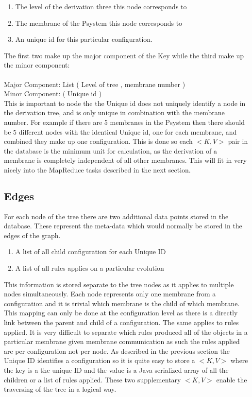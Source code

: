\documentclass[runningheads]{llncs}
\begin{document}
\begin{enumerate}
  \item The level of the derivation three this node corresponds to 
  \item The membrane of the Psystem this node corresponds to 
  \item An unique id for this particular configuration.
\end{enumerate}

The first two make up the major component of the Key while the third make up the minor component: \\ \\
Major Component: List ( Level of tree ,  membrane number ) \\
Minor Component: ( Unique id ) \\

This is important to node the the Unique id does not uniquely identify a node in the derivation tree, and is only unique in combination with the membrane number. For example if there are 5 membranes in the Psystem then there should be 5 different nodes with the identical Unique id, one for each membrane, and combined they make up one configuration. This is done so each $<K,V>$ pair in the database is the minimum unit for calculation, as the derivation of a membrane is completely independent of all other membranes. This will fit in very nicely into the MapReduce tasks described in the next section.

\subsection*{Edges}

For each node of the tree there are two additional data points stored in the database. These represent the meta-data which would normally be stored in the edges of the graph. 

\begin{enumerate}
  \item A list of all child configuration for each Unique ID
  \item A list of all rules applies on a particular evolution
\end{enumerate}

This information is stored separate to the tree nodes as it applies to multiple nodes simultaneously. Each node represents only one membrane from a configuration and it is trivial which membrane is the child of which membrane. This mapping can only be done at the configuration level as there is a directly link between the parent and child of a configuration. The same applies to rules applied. It is very difficult to separate which rules produced all of the objects in a particular membrane given membrane communication as such the rules applied are per configuration not per node. As described in the previous section the Unique ID identifies a configuration so it is quite easy to store a  $<K,V>$ where the key is a the unique ID and the value is a Java serialized array of all the children or a list of rules applied. These two supplementary $<K,V>$ enable the traversing of the tree in a logical way. 
\end{document}

